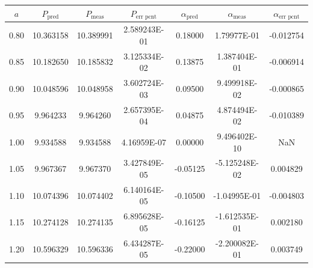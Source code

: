 \begin{tabular}{ccccccc}
            \toprule
            \textbf{$a$} & \textbf{$P_{\text{pred}}$} & \textbf{$P_{\text{meas}}$} & \textbf{$P_{\text{err pcnt}}$} & \textbf{$\alpha_{\text{pred}}$} & \textbf{$\alpha_{\text{meas}}$} & \textbf{$\alpha_{\text{err pcnt}}$} \\
            \midrule
            0.80 & 10.363158 & 10.389991 & 2.589243E-01 & 0.18000  & 1.79977E-01   & -0.012754 \\
            0.85 & 10.182650 & 10.185832 & 3.125334E-02 & 0.13875  & 1.387404E-01  & -0.006914 \\
            0.90 & 10.048596 & 10.048958 & 3.602724E-03 & 0.09500  & 9.499918E-02  & -0.000865 \\
            0.95 & 9.964233  & 9.964260  & 2.657395E-04 & 0.04875  & 4.874494E-02  & -0.010389 \\
            1.00 & 9.934588  & 9.934588  & 4.16959E-07  & 0.00000  & 9.496402E-10  & NaN \\
            1.05 & 9.967367  & 9.967370  & 3.427849E-05 & -0.05125 & -5.125248E-02 & 0.004829 \\
            1.10 & 10.074396 & 10.074402 & 6.140164E-05 & -0.10500 & -1.04995E-01  & -0.004803 \\
            1.15 & 10.274128 & 10.274135 & 6.895628E-05 & -0.16125 & -1.612535E-01 & 0.002180 \\
            1.20 & 10.596329 & 10.596336 & 6.434287E-05 & -0.22000 & -2.200082E-01 & 0.003749 \\
            \bottomrule
        \end{tabular}